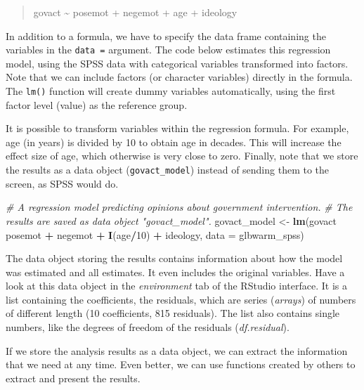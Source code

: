 \documentclass[doc,floatsintext]{apa6}
\newenvironment{Shaded}{\begin{snugshade}}{\end{snugshade}}
\newcommand{\KeywordTok}[1]{\textcolor[rgb]{0.13,0.29,0.53}{\textbf{#1}}}
\newcommand{\DataTypeTok}[1]{\textcolor[rgb]{0.13,0.29,0.53}{#1}}
\newcommand{\DecValTok}[1]{\textcolor[rgb]{0.00,0.00,0.81}{#1}}
\newcommand{\StringTok}[1]{\textcolor[rgb]{0.31,0.60,0.02}{#1}}
\newcommand{\CommentTok}[1]{\textcolor[rgb]{0.56,0.35,0.01}{\textit{#1}}}
\newcommand{\OperatorTok}[1]{\textcolor[rgb]{0.81,0.36,0.00}{\textbf{#1}}}
\newcommand{\NormalTok}[1]{#1}
\begin{document}
\begin{quote}
govact \textasciitilde{} posemot + negemot + age + ideology
\end{quote}

In addition to a formula, we have to specify the data frame containing
the variables in the \texttt{data\ =} argument. The code below estimates
this regression model, using the SPSS data with categorical variables
transformed into factors. Note that we can include factors (or character
variables) directly in the formula. The \texttt{lm()} function will
create dummy variables automatically, using the first factor level
(value) as the reference group.

It is possible to transform variables within the regression formula. For
example, age (in years) is divided by 10 to obtain age in decades. This
will increase the effect size of age, which otherwise is very close to
zero. Finally, note that we store the results as a data object
(\texttt{govact\_model}) instead of sending them to the screen, as SPSS
would do.

\begin{Shaded}
\begin{Highlighting}[]
\CommentTok{# A regression model predicting opinions about government intervention.}
\CommentTok{# The results are saved as data object "govact_model".}
\NormalTok{govact_model <-}\StringTok{ }\KeywordTok{lm}\NormalTok{(govact }\OperatorTok{~}\StringTok{ }\NormalTok{posemot }\OperatorTok{+}\StringTok{ }\NormalTok{negemot }\OperatorTok{+}\StringTok{ }\KeywordTok{I}\NormalTok{(age}\OperatorTok{/}\DecValTok{10}\NormalTok{) }\OperatorTok{+}\StringTok{ }\NormalTok{ideology,}
                   \DataTypeTok{data =}\NormalTok{ glbwarm_spss)}
\end{Highlighting}
\end{Shaded}

The data object storing the results contains information about how the
model was estimated and all estimates. It even includes the original
variables. Have a look at this data object in the \emph{environment} tab
of the RStudio interface. It is a list containing the coefficients, the
residuals, which are series (\emph{arrays}) of numbers of different
length (10 coefficients, 815 residuals). The list also contains single
numbers, like the degrees of freedom of the residuals
(\emph{df.residual}).

If we store the analysis results as a data object, we can extract the
information that we need at any time. Even better, we can use functions
created by others to extract and present the results.
\end{document}
